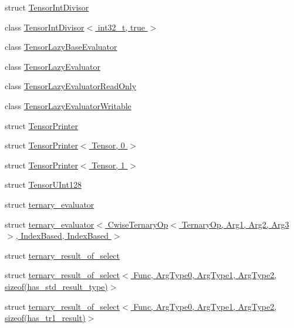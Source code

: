 \begin{DoxyCompactItemize}
\item 
struct \hyperlink{struct_eigen_1_1internal_1_1_tensor_int_divisor}{Tensor\+Int\+Divisor}
\item 
class \hyperlink{class_eigen_1_1internal_1_1_tensor_int_divisor_3_01int32__t_00_01true_01_4}{Tensor\+Int\+Divisor$<$ int32\+\_\+t, true $>$}
\item 
class \hyperlink{class_eigen_1_1internal_1_1_tensor_lazy_base_evaluator}{Tensor\+Lazy\+Base\+Evaluator}
\item 
class \hyperlink{class_eigen_1_1internal_1_1_tensor_lazy_evaluator}{Tensor\+Lazy\+Evaluator}
\item 
class \hyperlink{class_eigen_1_1internal_1_1_tensor_lazy_evaluator_read_only}{Tensor\+Lazy\+Evaluator\+Read\+Only}
\item 
class \hyperlink{class_eigen_1_1internal_1_1_tensor_lazy_evaluator_writable}{Tensor\+Lazy\+Evaluator\+Writable}
\item 
struct \hyperlink{struct_eigen_1_1internal_1_1_tensor_printer}{Tensor\+Printer}
\item 
struct \hyperlink{struct_eigen_1_1internal_1_1_tensor_printer_3_01_tensor_00_010_01_4}{Tensor\+Printer$<$ Tensor, 0 $>$}
\item 
struct \hyperlink{struct_eigen_1_1internal_1_1_tensor_printer_3_01_tensor_00_011_01_4}{Tensor\+Printer$<$ Tensor, 1 $>$}
\item 
struct \hyperlink{struct_eigen_1_1internal_1_1_tensor_u_int128}{Tensor\+U\+Int128}
\item 
struct \hyperlink{struct_eigen_1_1internal_1_1ternary__evaluator}{ternary\+\_\+evaluator}
\item 
struct \hyperlink{struct_eigen_1_1internal_1_1ternary__evaluator_3_01_cwise_ternary_op_3_01_ternary_op_00_01_arg1_daf42d21bcfee99cfa54e03ffa9506fc}{ternary\+\_\+evaluator$<$ Cwise\+Ternary\+Op$<$ Ternary\+Op, Arg1, Arg2, Arg3 $>$, Index\+Based, Index\+Based $>$}
\item 
struct \hyperlink{struct_eigen_1_1internal_1_1ternary__result__of__select}{ternary\+\_\+result\+\_\+of\+\_\+select}
\item 
struct \hyperlink{struct_eigen_1_1internal_1_1ternary__result__of__select_3_01_func_00_01_arg_type0_00_01_arg_type08876e51e06da3c04eed1c2a00032f26}{ternary\+\_\+result\+\_\+of\+\_\+select$<$ Func, Arg\+Type0, Arg\+Type1, Arg\+Type2, sizeof(has\+\_\+std\+\_\+result\+\_\+type)$>$}
\item 
struct \hyperlink{struct_eigen_1_1internal_1_1ternary__result__of__select_3_01_func_00_01_arg_type0_00_01_arg_type6eb986b9b1e9aafbcbfee4e37d87eaa7}{ternary\+\_\+result\+\_\+of\+\_\+select$<$ Func, Arg\+Type0, Arg\+Type1, Arg\+Type2, sizeof(has\+\_\+tr1\+\_\+result)$>$}

\end{DoxyCompactItemize}
